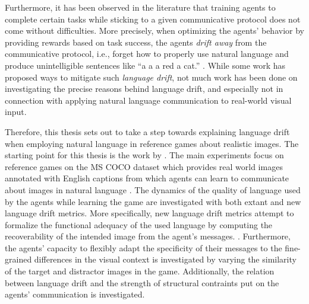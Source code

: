 Furthermore, it has been observed in the literature that training agents to complete certain tasks while sticking to a given communicative protocol does not come without difficulties. More precisely, when optimizing the agents' behavior by providing rewards based on task success, the agents \textit{drift away} from the communicative protocol, i.e., forget how to properly use natural language and produce unintelligible sentences like ``a a a red a cat.'' \parencite{lee2019countering, lazaridou2020multi, lu2020countering, lewis2017deal}. While some work has proposed ways to mitigate such \textit{language drift}, not much work has been done on investigating the precise reasons behind language drift, and especially not in connection with applying natural language communication to real-world visual input. 

Therefore, this thesis sets out to take a step towards explaining language drift when employing natural language in reference games about realistic images. The starting point for this thesis is the work by \cite{lazaridou2020multi}. The main  experiments focus on reference games on the MS COCO dataset which provides real world images annotated with English captions from which agents can learn to communicate about images in natural language \parencite{chen2015microsoft}. The dynamics of the quality of language used by the agents while learning the game are investigated with both extant and new language drift metrics. More specifically, new language drift metrics attempt to formalize the functional adequacy of the used language by computing the recoverability of the intended image from the agent's messages. . Furthermore, the agents' capacity to flexibly adapt the specificity of their messages to the fine-grained differences in the visual context is investigated by varying the similarity of the target and distractor images in the game. Additionally, the relation between language drift and the strength of structural contraints put on the agents' communication is investigated.

